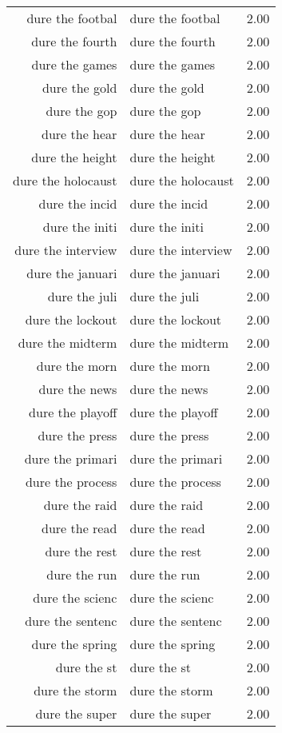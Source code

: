\begin{table}[ht]
\begin{tabular}{rlr}
  dure the footbal & dure the footbal & 2.00 \\ 
  dure the fourth & dure the fourth & 2.00 \\ 
  dure the games & dure the games & 2.00 \\ 
  dure the gold & dure the gold & 2.00 \\ 
  dure the gop & dure the gop & 2.00 \\ 
  dure the hear & dure the hear & 2.00 \\ 
  dure the height & dure the height & 2.00 \\ 
  dure the holocaust & dure the holocaust & 2.00 \\ 
  dure the incid & dure the incid & 2.00 \\ 
  dure the initi & dure the initi & 2.00 \\ 
  dure the interview & dure the interview & 2.00 \\ 
  dure the januari & dure the januari & 2.00 \\ 
  dure the juli & dure the juli & 2.00 \\ 
  dure the lockout & dure the lockout & 2.00 \\ 
  dure the midterm & dure the midterm & 2.00 \\ 
  dure the morn & dure the morn & 2.00 \\ 
  dure the news & dure the news & 2.00 \\ 
  dure the playoff & dure the playoff & 2.00 \\ 
  dure the press & dure the press & 2.00 \\ 
  dure the primari & dure the primari & 2.00 \\ 
  dure the process & dure the process & 2.00 \\ 
  dure the raid & dure the raid & 2.00 \\ 
  dure the read & dure the read & 2.00 \\ 
  dure the rest & dure the rest & 2.00 \\ 
  dure the run & dure the run & 2.00 \\ 
  dure the scienc & dure the scienc & 2.00 \\ 
  dure the sentenc & dure the sentenc & 2.00 \\ 
  dure the spring & dure the spring & 2.00 \\ 
  dure the st & dure the st & 2.00 \\ 
  dure the storm & dure the storm & 2.00 \\ 
  dure the super & dure the super & 2.00 \\ 

\end{tabular}
\end{table}
